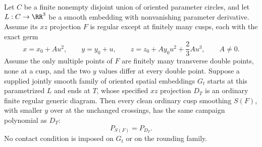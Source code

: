 \begin{lemma}
\label{cp:finite-contact-path}\leanok
Let $C$ be a finite nonempty disjoint union of oriented parameter circles,
and let $L:C\to\RR^3$ be a smooth embedding with nonvanishing parameter
derivative. Assume its $xz$ projection $F$ is regular except at finitely
many cusps, each with the exact germ
\begin{equation}\label{cp:exact-cusp}
 x=x_0+Au^2,\qquad y=y_0+u,\qquad
 z=z_0+Ay_0u^2+\frac23Au^3,\qquad A\ne0.
\end{equation}
Assume the only multiple points of $F$ are finitely many transverse
double points, none at a cusp, and the two $y$ values differ at every
double point. Suppose a supplied jointly
smooth family of oriented spatial embeddings $G_t$ starts at this
parametrized $L$ and ends at $T$, whose specified $xz$ projection $D_T$
is an ordinary finite regular generic diagram. Then every clean ordinary
cusp smoothing $S(F)$, with smaller $y$ over at the unchanged crossings,
has the same campaign polynomial as $D_T$:
\begin{equation}\label{cp:endpoint-polynomial}
                    P_{S(F)}=P_{D_T}.
\end{equation}
No contact condition is imposed on $G_t$ or on the rounding family.

\end{lemma}
